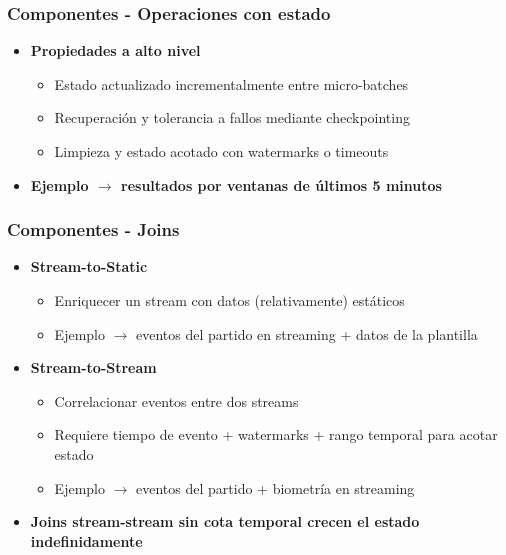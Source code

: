 \documentclass[aspectratio=169]{beamer}
\begin{document}
\begin{frame}\frametitle{Componentes - Operaciones con estado}
	\begin{itemize}
		\item \textbf{Propiedades a alto nivel}
		\begin{itemize}
			\item Estado actualizado incrementalmente entre micro-batches
			\item Recuperación y tolerancia a fallos mediante checkpointing
			\item Limpieza y estado acotado con watermarks o timeouts
		\end{itemize}

		\vspace{1em}

		\item \textbf{Ejemplo $\rightarrow$ resultados por ventanas de últimos 5 minutos}
	\end{itemize}
\end{frame}


\begin{frame}\frametitle{Componentes - Joins}
	\begin{itemize}
		\item \textbf{Stream-to-Static}
		\begin{itemize}
			\item Enriquecer un stream con datos (relativamente) estáticos
			\item Ejemplo $\rightarrow$ eventos del partido en streaming + datos de la plantilla
		\end{itemize}

		\vspace{1em}

		\item \textbf{Stream-to-Stream}
		\begin{itemize}
			\item Correlacionar eventos entre dos streams
			\item Requiere tiempo de evento + watermarks + rango temporal para acotar estado
			\item Ejemplo $\rightarrow$ eventos del partido + biometría en streaming
		\end{itemize}

		\vspace{1em}

	\item \textbf{Joins stream-stream sin cota temporal crecen el estado indefinidamente}
	\end{itemize}
\end{frame}
\end{document}
